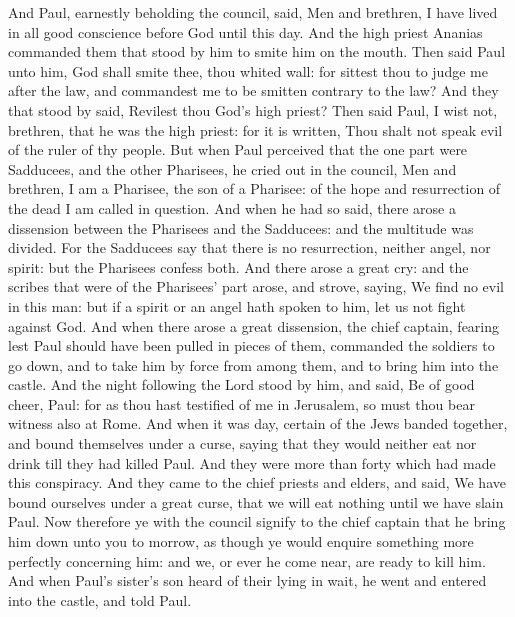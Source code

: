  And Paul, earnestly beholding the council, said, Men and
brethren, I have lived in all good conscience before God until this day.
 And the high priest Ananias commanded them that stood by
him to smite him on the mouth.  Then said Paul unto him,
God shall smite thee, thou whited wall: for sittest thou to judge me
after the law, and commandest me to be smitten contrary to the law?
 And they that stood by said, Revilest thou God's high
priest?  Then said Paul, I wist not, brethren, that he was
the high priest: for it is written, Thou shalt not speak evil of the
ruler of thy people.  But when Paul perceived that the one
part were Sadducees, and the other Pharisees, he cried out in the
council, Men and brethren, I am a Pharisee, the son of a Pharisee: of
the hope and resurrection of the dead I am called in question.
 And when he had so said, there arose a dissension between
the Pharisees and the Sadducees: and the multitude was divided.
 For the Sadducees say that there is no resurrection,
neither angel, nor spirit: but the Pharisees confess both.
 And there arose a great cry: and the scribes that were of
the Pharisees' part arose, and strove, saying, We find no evil in this
man: but if a spirit or an angel hath spoken to him, let us not fight
against God.  And when there arose a great dissension,
the chief captain, fearing lest Paul should have been pulled in pieces
of them, commanded the soldiers to go down, and to take him by force
from among them, and to bring him into the castle.  And
the night following the Lord stood by him, and said, Be of good cheer,
Paul: for as thou hast testified of me in Jerusalem, so must thou bear
witness also at Rome.  And when it was day, certain of
the Jews banded together, and bound themselves under a curse, saying
that they would neither eat nor drink till they had killed Paul.
 And they were more than forty which had made this
conspiracy.  And they came to the chief priests and
elders, and said, We have bound ourselves under a great curse, that we
will eat nothing until we have slain Paul.  Now therefore
ye with the council signify to the chief captain that he bring him down
unto you to morrow, as though ye would enquire something more perfectly
concerning him: and we, or ever he come near, are ready to kill him.
 And when Paul's sister's son heard of their lying in
wait, he went and entered into the castle, and told Paul.
